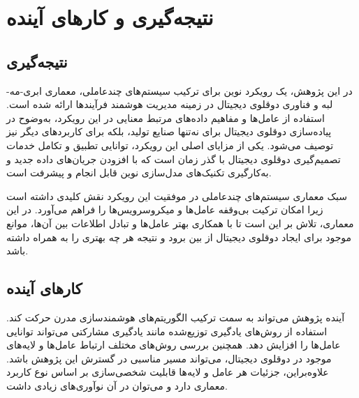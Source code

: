 \chapter{نتیجه‌گیری و کار‌های آینده}

\section{نتیجه‌گیری}
در این پژوهش، یک رویکرد نوین برای ترکیب سیستم‌های چندعاملی، معماری ابری-مه-لبه و فناوری دوقلوی دیجیتال در زمینه مدیریت هوشمند فرآیندها ارائه شده است.
استفاده از عامل‌ها و مفاهیم داده‌های مرتبط معنایی در این رویکرد، به‌وضوح در پیاده‌سازی دوقلوی دیجیتال برای نه‌تنها صنایع تولید، بلکه برای کاربرد‌های دیگر نیز توصیف می‌شود. یکی از مزایای اصلی این رویکرد، توانایی تطبیق و تکامل خدمات تصمیم‌گیری دوقلوی دیجیتال با گذر زمان است که با افزودن جریان‌های داده جدید و به‌کارگیری تکنیک‌های مدل‌سازی نوین قابل انجام و پیشرفت است.

سبک معماری سیستم‌های چندعاملی در موفقیت این رویکرد نقش کلیدی داشته است زیرا امکان ترکیت بی‌وقفه عامل‌ها و میکروسرویس‌ها را فراهم می‌آورد. در این معماری، تلاش بر این است تا با همکاری بهتر عامل‌ها و تبادل اطلاعات بین آن‌ها، موانع موجود برای ایجاد دوقلوی دیجیتال از بین برود و نتیجه هر چه بهتری را به همراه داشته باشد.

\section{کار‌های آینده}
آینده پژوهش می‌تواند به سمت ترکیب الگوریتم‌های هوشمند‌سازی مدرن حرکت کند. استفاده از روش‌های یادگیری توزیع‌شده مانند یادگیری مشارکتی
می‌تواند توانایی عامل‌ها را افزایش دهد. همچنین بررسی روش‌های مختلف ارتباط عامل‌ها و لایه‌های موجود در دوقلوی دیجیتال، می‌تواند مسیر مناسبی در گسترش این پژوهش باشد. علاوه‌براین، جزئیات هر عامل و لایه‌ها قابلیت شخصی‌سازی بر اساس نوع کاربرد معماری دارد و می‌توان در آن نو‌آوری‌های زیادی داشت.